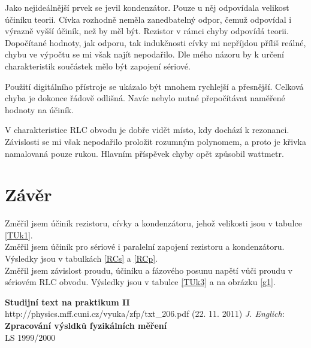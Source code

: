 \documentclass[a4paper,12pt]{article}
\begin{document}
Jako nejideálnější prvek se jevil kondenzátor. Pouze u něj odpovídala velikost účiníku teorii. 
Cívka rozhodně neměla zanedbatelný odpor, čemuž odpovídal  i výrazně vyšší účiník, než by měl být. 
Rezistor v rámci chyby odpovídá teorii. Dopočítané hodnoty, jak odporu, tak indukčnosti cívky mi 
nepříjdou příliš reálné, chybu ve výpočtu se mi však najít nepodařilo. Dle mého názoru by k určení 
charakteristik součástek mělo být zapojení sériové.

Použití digitálního přístroje se ukázalo být mnohem rychlejší a přesnější. Celková chyba je dokonce řádově 
odlišná. Navíc nebylo nutné přepočítávat naměřené hodnoty na účiník.

V charakteristice RLC obvodu je dobře vidět místo, kdy dochází k rezonanci. Závislosti se mi však nepodařilo 
proložit rozumným polynomem, a proto je křivka namalovaná pouze rukou. Hlavním příspěvek chyby 
opět způsobil wattmetr.

\section{Závěr}
Změřil jsem účiník rezistoru, cívky a kondenzátoru, jehož velikosti jsou v tabulce \ref{TUk1}.\\
Změřil jsem účiník pro sériové i paralelní zapojení rezistoru a kondenzátoru. Výsledky jsou v tabulkách \ref{RCs} a \ref{RCp}.\\
Změřil jsem závislost proudu, účiníku a fázového posunu napětí vůči proudu v sériovém RLC obvodu. Výsledky jsou v tabulce \ref{TUk3} a na obrázku \ref{g1}.

\begin{thebibliography}{5}
	 \textbf{Studijní text na praktikum II} \\http://physics.mff.cuni.cz/vyuka/zfp/txt\_206.pdf (22. 11. 2011)
     \emph{J. Englich}: \textbf{Zpracování výsldků fyzikálních měření} \\ LS 1999/2000
\end{thebibliography}
\end{document}
